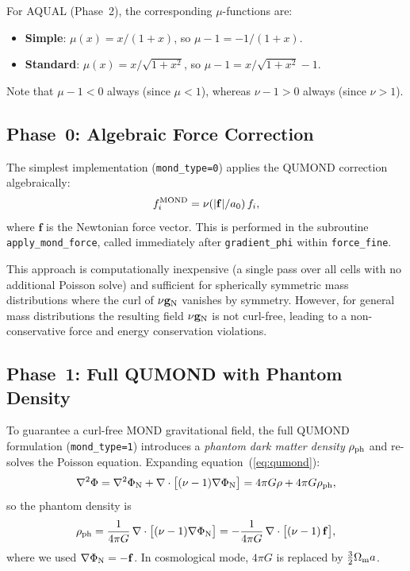 \documentclass[fleqn,usenatbib]{mnras}
\newcommand{\code}[1]{\texttt{#1}}
\newcommand{\Om}{\Omega_{\rm m}}
\newcommand{\azero}{a_0}
\newcommand{\gN}{\mathbf{g}_{\rm N}}
\newcommand{\rhoph}{\rho_{\rm ph}}
\begin{document}
For AQUAL (Phase~2), the corresponding $\mu$-functions are:
\begin{itemize}
\item \textbf{Simple}: $\mu(x) = x/(1+x)$, so $\mu - 1 = -1/(1+x)$.
\item \textbf{Standard}: $\mu(x) = x/\sqrt{1+x^2}$, so
  $\mu - 1 = x/\sqrt{1+x^2} - 1$.
\end{itemize}
Note that $\mu - 1 < 0$ always (since $\mu < 1$), whereas
$\nu - 1 > 0$ always (since $\nu > 1$).

\subsection{Phase~0: Algebraic Force Correction}
\label{sec:mond_phase0}

The simplest implementation (\code{mond\_type=0}) applies the QUMOND
correction algebraically:
\begin{equation}
f_i^{\rm MOND} = \nu(|\mathbf{f}|/\azero)\, f_i,
\label{eq:mond_algebraic}
\end{equation}
where $\mathbf{f}$ is the Newtonian force vector.  This is performed
in the subroutine \code{apply\_mond\_force}, called immediately after
\code{gradient\_phi} within \code{force\_fine}.

This approach is computationally inexpensive (a single pass over all
cells with no additional Poisson solve) and sufficient for
spherically symmetric mass distributions where the curl of $\nu\gN$
vanishes by symmetry.  However, for general mass distributions the
resulting field $\nu\gN$ is not curl-free, leading to a
non-conservative force and energy conservation violations.

\subsection{Phase~1: Full QUMOND with Phantom Density}
\label{sec:mond_phase1}

To guarantee a curl-free MOND gravitational field, the full QUMOND
formulation (\code{mond\_type=1}) introduces a \emph{phantom dark
matter density} $\rhoph$ and re-solves the Poisson equation.  Expanding
equation~(\ref{eq:qumond}):
\begin{equation}
\nabla^2 \Phi = \nabla^2 \Phi_{\rm N} + \nabla\cdot\bigl[(\nu-1)
\nabla\Phi_{\rm N}\bigr]
= 4\pi G\rho + 4\pi G\rhoph,
\label{eq:phantom_split}
\end{equation}
so the phantom density is
\begin{equation}
\rhoph = \frac{1}{4\pi G}\,\nabla\cdot\bigl[(\nu-1)
\nabla\Phi_{\rm N}\bigr]
= -\frac{1}{4\pi G}\,\nabla\cdot\bigl[(\nu-1)\,\mathbf{f}\bigr],
\label{eq:rho_phantom}
\end{equation}
where we used $\nabla\Phi_{\rm N} = -\mathbf{f}$.  In cosmological
mode, $4\pi G$ is replaced by $\tfrac{3}{2}\Om a$.
\end{document}

